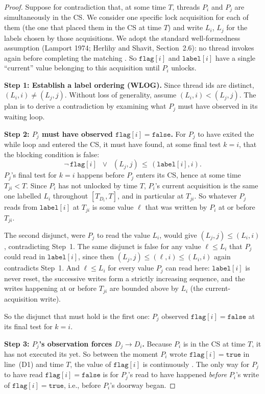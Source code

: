 \begin{proof}
Suppose for contradiction that, at some time $T$, threads $P_i$ and $P_j$ are
simultaneously in the CS. We consider one specific lock acquisition for each
of them (the one that placed them in the CS at time $T$) and write $L_i$,
$L_j$ for the labels chosen by those acquisitions. We adopt the standard
well-formedness assumption (Lamport 1974; Herlihy and Shavit, Section~2.6):
no thread invokes  again before completing the matching
. So $\texttt{flag}[i]$ and $\texttt{label}[i]$ have a
single ``current'' value belonging to this acquisition until $P_i$ unlocks.

\medskip
\noindent\textbf{Step 1: Establish a label ordering (WLOG).}
Since thread ids are distinct, $(L_i, i) \neq (L_j, j)$. Without loss of
generality, assume $(L_i, i) < (L_j, j)$. The plan is to derive a
contradiction by examining what $P_j$ must have observed in its waiting loop.

\medskip
\noindent\textbf{Step 2: $P_j$ must have observed $\texttt{flag}[i] = \texttt{false}$.}
For $P_j$ to have exited the while loop and entered the CS, it must have
found, at some final test $k=i$, that the blocking condition is false:
\[
  \neg\,\texttt{flag}[i] \;\;\lor\;\; (L_j, j) \,\leq\, (\texttt{label}[i], i).
\]
$P_j$'s final test for $k=i$ happens before $P_j$ enters its CS, hence at
some time $T_{ji} < T$. Since $P_i$ has not unlocked by time $T$, $P_i$'s
current acquisition is the same one labelled $L_i$ throughout $[T_{D_i},
T]$, and in particular at $T_{ji}$. So whatever $P_j$ reads from
$\texttt{label}[i]$ at $T_{ji}$ is some value $\ell$ that was written by
$P_i$ at or before $T_{ji}$.

The second disjunct, were $P_j$ to read the value $L_i$, would give
$(L_j, j) \leq (L_i, i)$, contradicting Step~1. The same disjunct is
false for any value $\ell \leq L_i$ that $P_j$ could read in
$\texttt{label}[i]$, since then $(L_j, j) \leq (\ell, i) \leq (L_i, i)$
again contradicts Step~1. And $\ell \leq L_i$ for every value $P_j$ can
read here: $\texttt{label}[i]$ is never reset, the successive writes form
a strictly increasing sequence, and the writes happening at or before
$T_{ji}$ are bounded above by $L_i$ (the current-acquisition write).

So the disjunct that must hold is the first one: $P_j$ observed
$\texttt{flag}[i] = \texttt{false}$ at its final test for $k=i$.

\medskip
\noindent\textbf{Step 3: $P_j$'s observation forces $D_j \to D_i$.}
Because $P_i$ is in the CS at time $T$, it has not executed its
 yet. So between the moment $P_i$ wrote
$\texttt{flag}[i] = \texttt{true}$ in line~(D1) and time $T$, the value of
$\texttt{flag}[i]$ is continuously . The only way for $P_j$ to
have read $\texttt{flag}[i] = \texttt{false}$ is for $P_j$'s read to have
happened \emph{before} $P_i$'s write of $\texttt{flag}[i] = \texttt{true}$,
i.e., before $P_i$'s doorway began.


\end{proof}
